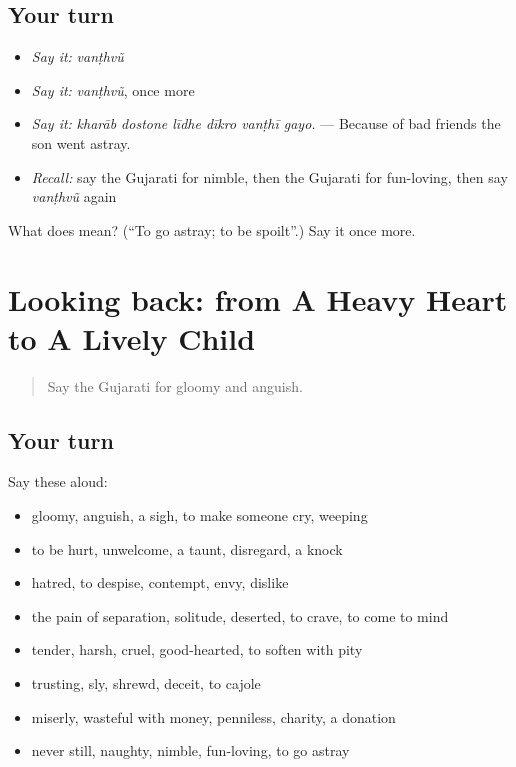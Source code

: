 \subsection*{Your turn}
\begin{itemize}
\raggedright
  \item \emph{Say it:} \emph{vanṭhvũ}
  \item \emph{Say it:} \emph{vanṭhvũ}, once more
  \item \emph{Say it:} \emph{kharāb dostone līdhe dīkro vanṭhī gayo.} — Because of bad friends the son went astray.
  \item \emph{Recall:} say the Gujarati for nimble, then the Gujarati for fun-loving, then say \emph{vanṭhvũ} again
\end{itemize}

\begin{tcolorbox}[breakable,colback=teal!4,colframe=teal!35!black,title={Before you move on}]
What does  mean? (\textquotedblleft{}To go astray; to be spoilt\textquotedblright{}.) Say it once more.
\end{tcolorbox}
\section[(dialogue)]{Looking back: from A Heavy Heart to A Lively Child}

\label{lesson:GU-R462-review-455-462}



\begin{quote}
Say the Gujarati for gloomy and anguish.
\end{quote}

\subsection*{Your turn}
Say these aloud:

\begin{itemize}
\raggedright
  \item gloomy, anguish, a sigh, to make someone cry, weeping
  \item to be hurt, unwelcome, a taunt, disregard, a knock
  \item hatred, to despise, contempt, envy, dislike
  \item the pain of separation, solitude, deserted, to crave, to come to mind
  \item tender, harsh, cruel, good-hearted, to soften with pity
  \item trusting, sly, shrewd, deceit, to cajole
  \item miserly, wasteful with money, penniless, charity, a donation
  \item never still, naughty, nimble, fun-loving, to go astray
\end{itemize}

